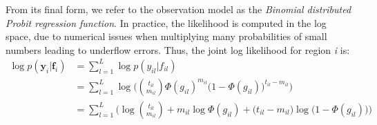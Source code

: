 From its final form, we refer to the observation model as the \emph{Binomial distributed Probit regression function}. In practice, the likelihood is computed in the log space, due to numerical issues when multiplying many probabilities of small numbers leading to underflow errors. Thus, the joint log likelihood for region \emph{i} is:
\begin{equation} \label{likel-binom-prob-log-f-meth}
  \begin{split}
	\log p(\mathbf{y}_{i}|\mathbf{f}_{i}) & = \sum_{l=1}^{L} \log p(y_{il}|f_{il}) \\
				& = \sum_{l=1}^{L} \log \bigg(\binom{t_{il}}{m_{il}} \Phi(g_{il})^{m_{il}} \big(1 - \Phi(g_{il})\big)^{t_{il} - m_{il}}\bigg) \\
				& = \sum_{l=1}^{L} \bigg(\log \binom{t_{il}}{m_{il}} + m_{il} \log \Phi(g_{il}) + \big(t_{il} - m_{il} \big) \log \big(1 - \Phi(g_{il})\big)\bigg)
  \end{split}
\end{equation}